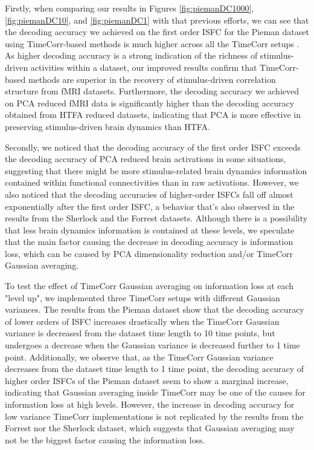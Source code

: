 \documentclass[11pt]{article}
\begin{document}
Firstly, when comparing our results in Figures \ref{fig:piemanDC1000}, \ref{fig:piemanDC10}, and \ref{fig:piemanDC1} with that previous efforts, we can see that the decoding accuracy we achieved on the first order ISFC for the Pieman dataset using TimeCorr-based methods is much higher across all the TimeCorr setups \citep{jeremy2017}. As higher decoding accuracy is a strong indication of the richness of stimulus-driven activities within a dataset, our improved results confirm that TimeCorr-based methods are superior in the recovery of stimulus-driven correlation structure from fMRI datasets. Furthermore, the decoding accuracy we achieved on PCA reduced fMRI data is significantly higher than the decoding accuracy obtained from HTFA reduced datasets, indicating that PCA is more effective in preserving stimulus-driven brain dynamics than HTFA.

Secondly, we noticed that the decoding accuracy of the first order ISFC exceeds the decoding accuracy of PCA reduced brain activations in some situations, suggesting that there might be more stimulus-related brain dynamics information contained within functional connectivities than in raw activations. However, we also noticed that the decoding accuracies of higher-order ISFCs fall off almost exponentially after the first order ISFC, a behavior that's also observed in the results from the Sherlock and the Forrest datasets. Although there is a possibility that less brain dynamics information is contained at these levels, we speculate that the main factor causing the decrease in decoding accuracy is information loss, which can be caused by PCA dimensionality reduction and/or TimeCorr Gaussian averaging.

To test the effect of TimeCorr Gaussian averaging on information loss at each "level up", we implemented three TimeCorr setups with different Gaussian variances. The results from the Pieman dataset show that the decoding accuracy of lower orders of ISFC increases drastically when the TimeCorr Gaussian variance is decreased from the dataset time length to 10 time points, but undergoes a decrease when the Gaussian variance is decreased further to 1 time point. Additionally, we observe that, as the TimeCorr Gaussian variance decreases from the dataset time length to 1 time point, the decoding accuracy of higher order ISFCs of the Pieman dataset seem to show a marginal increase, indicating that Gaussian averaging inside TimeCorr may be one of the causes for information loss at high levels. However, the increase in decoding accuracy for low variance TimeCorr implementations is not replicated by the results from the Forrest nor the Sherlock dataset, which suggests that Gaussian averaging may not be the biggest factor causing the information loss.
\end{document}
